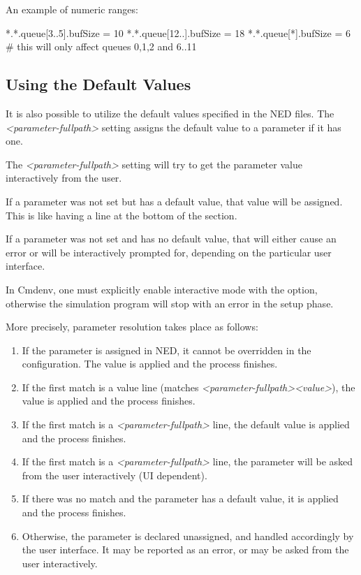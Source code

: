 An example of numeric ranges:

\begin{inifile}
[General]
*.*.queue[3..5].bufSize = 10
*.*.queue[12..].bufSize = 18
*.*.queue[*].bufSize = 6  # this will only affect queues 0,1,2 and 6..11
\end{inifile}


\subsection{Using the Default Values}
\label{sec:config-sim:using-default-values}

It is also possible to utilize the default values specified in the NED files.
The \textit{<parameter-fullpath>} setting assigns
the default value to a parameter if it has one.

The \textit{<parameter-fullpath>} setting will try to get the parameter
value interactively from the user.

If a parameter was not set but has a default value, that value will be
assigned. This is like having a  line at the
bottom of the \ttt{[General]} section.

If a parameter was not set and has no default value, that will either
cause an error or will be interactively prompted for, depending
on the particular user interface.

\begin{note}
In Cmdenv, one must explicitly enable interactive mode with the
 option, otherwise the simulation
program will stop with an error in the setup phase.
\end{note}

More precisely, parameter resolution takes place as follows:

\begin{enumerate}
\item If the parameter is assigned in NED, it cannot be overridden in the
    configuration. The value is applied and the process finishes.
\item If the first match is a value line (matches
    \textit{<parameter-fullpath>}\ttt{=}\textit{<value>}), the value is
    applied and the process finishes.
\item If the first match is a \textit{<parameter-fullpath>} line,
    the default value is applied and the process finishes.
\item If the first match is a \textit{<parameter-fullpath>} line,
    the parameter will be asked from the user interactively (UI dependent).
\item If there was no match and the parameter has a default value, it is applied
    and the process finishes.
\item Otherwise, the parameter is declared unassigned, and handled accordingly
    by the user interface. It may be reported as an error, or may be
    asked from the user interactively.
\end{enumerate}


